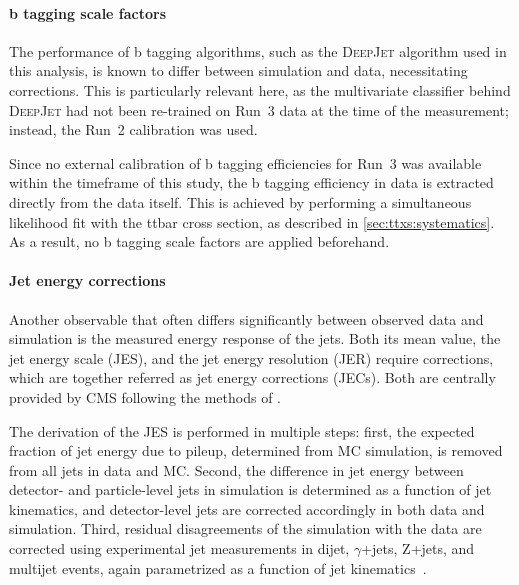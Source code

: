 
\paragraph{b tagging scale factors}

The performance of b tagging algorithms, such as the \textsc{DeepJet} algorithm used in this analysis, is known to differ between simulation and data, necessitating corrections. This is particularly relevant here, as the multivariate classifier behind \textsc{DeepJet} had not been re-trained on Run~3 data at the time of the measurement; instead, the Run~2 calibration was used. 

Since no external calibration of b tagging efficiencies for Run~3 was available within the timeframe of this study, the b tagging efficiency in data is extracted directly from the data itself. This is achieved by performing a simultaneous likelihood fit with the ttbar cross section, as described in \cref{sec:ttxs:systematics}. As a result, no b tagging scale factors are applied beforehand. 

\paragraph{Jet energy corrections}

Another observable that often differs significantly between observed data and simulation is the measured energy response of the jets. Both its mean value, the jet energy scale (JES), and the jet energy resolution (JER) require corrections, which are together referred as jet energy corrections (JECs). Both are centrally provided by CMS following the methods of . 

The derivation of the JES is performed in multiple steps:
first, the expected fraction of jet energy due to pileup, determined from MC simulation, is removed from all jets in data and MC. Second, the difference in jet energy between detector- and particle-level jets in simulation is determined as a function of jet kinematics, and detector-level jets are corrected accordingly in both data and simulation.
Third, residual disagreements of the simulation with the data are corrected using experimental jet measurements in dijet, $\gamma$+jets, Z+jets, and multijet events, again parametrized as a function of jet kinematics~\cite{CMS:JME-13-004}.

